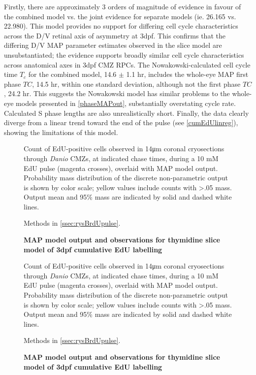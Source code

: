 Firstly, there are approximately 3 orders of magnitude of evidence in favour of the combined model vs. the joint evidence for separate models (ie. 26.165 vs. 22.980). This model provides no support for differing cell cycle characteristics across the D/V retinal axis of asymmetry at 3dpf. This confirms that the differing D/V MAP parameter estimates observed in the slice model are unsubstantiated; the evidence supports broadly similar cell cycle characteristics across anatomical axes in 3dpf CMZ RPCs. The Nowakowski-calculated cell cycle time $T_c$ for the combined model, 14.6 $\pm$ 1.1 hr, includes the whole-eye MAP first phase $TC$, 14.5 hr, within one standard deviation, although not the first phase $TC$, 24.2 hr. This suggests the Nowakowski model has similar problems to the whole-eye models presented in \autoref{phaseMAPout}, substantially overstating cycle rate. Calculated S phase lengths are also unrealistically short. Finally, the data clearly diverge from a linear trend toward the end of the pulse (see \autoref{cumEdUlinreg}), showing the limitations of this model.

\begin{figure}[!h]
    \caption{{\bf MAP model output and observations for thymidine slice model of 3dpf cumulative EdU labelling}}
    Count of EdU-positive cells observed in 14\si{\micro\metre} coronal cryosections through \textit{Danio} CMZs, at indicated chase times, during a 10 mM EdU pulse (magenta crosses), overlaid with MAP model output. Probability mass distribution of the discrete non-parametric output is shown by color scale; yellow values include counts with >.05 mass. Output mean and 95\% mass are indicated by solid and dashed white lines.

    Methods in \autoref{ssec:rysBrdUpulse}.
    \label{a25MAP}
\end{figure}

\begin{figure}[!h]
    \caption{{\bf MAP model output and observations for thymidine slice model of 3dpf cumulative EdU labelling}}
    Count of EdU-positive cells observed in 14\si{\micro\metre} coronal cryosections through \textit{Danio} CMZs, at indicated chase times, during a 10 mM EdU pulse (magenta crosses), overlaid with MAP model output. Probability mass distribution of the discrete non-parametric output is shown by color scale; yellow values include counts with >.05 mass. Output mean and 95\% mass are indicated by solid and dashed white lines.

    Methods in \autoref{ssec:rysBrdUpulse}.
    \label{a25MAP}
\end{figure}

